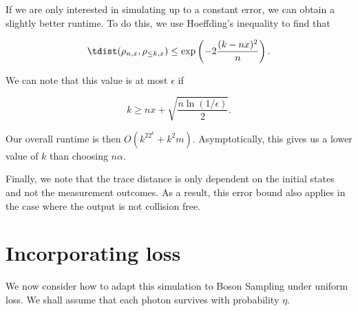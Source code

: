If we are only interested in simulating up to a constant error, we can obtain a slightly better runtime. To do this, we use Hoeffding's inequality to find that

\begin{equation}
\label{eqn:constant-error-truncation}
\tdist(\rho_{n,x},\rho_{\leq k,x}) \leq \exp\left(-2\frac{(k-nx)^2}{n}\right).
\end{equation}

\noindent We can note that this value is at most $\epsilon$ if

\begin{equation}
k \geq nx + \sqrt{\frac{n\ln(1/\epsilon)}{2}}.
\end{equation}

\noindent Our overall runtime is then $O(k^22^k+k^2m)$. Asymptotically, this gives us a lower value of $k$ than choosing $n\alpha$.

Finally, we note that the trace distance is only dependent on the initial states and not the measurement outcomes. 
As a result, this error bound also applies in the case where the output is not collision free.





\section{Incorporating loss}
\label{sec:loss}

We now consider how to adapt this simulation to Boson Sampling under uniform loss. We shall assume that each photon survives with probability $\eta$.


